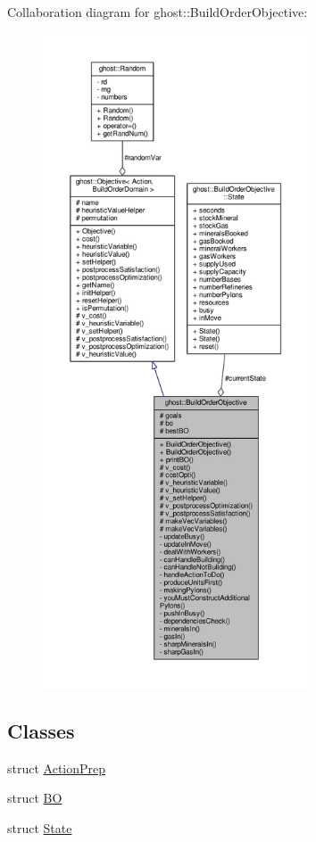 Collaboration diagram for ghost\-:\-:Build\-Order\-Objective\-:
\nopagebreak
\begin{figure}[H]
\begin{center}
\leavevmode
\includegraphics[height=550pt]{classghost_1_1BuildOrderObjective__coll__graph}
\end{center}
\end{figure}
\subsection*{Classes}
\begin{DoxyCompactItemize}
\item 
struct \hyperlink{structghost_1_1BuildOrderObjective_1_1ActionPrep}{Action\-Prep}
\item 
struct \hyperlink{structghost_1_1BuildOrderObjective_1_1BO}{B\-O}
\item 
struct \hyperlink{structghost_1_1BuildOrderObjective_1_1State}{State}
\end{DoxyCompactItemize}
